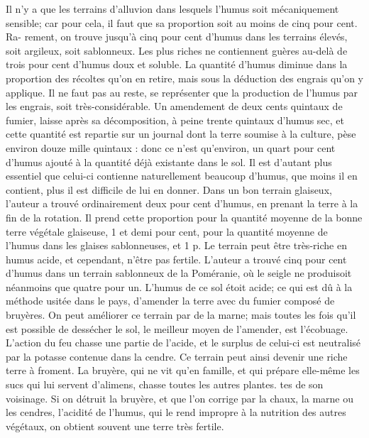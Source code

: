 Il n'y a que les terrains d'alluvion dans lesquels l'humus soit mécaniquement sensible; car pour cela, il faut que sa proportion soit au moins de cinq pour cent. Ra-\setcounter{page}{124} rement, on trouve jusqu'à cinq pour cent d'humus dans les terrains élevés, soit argileux, soit sablonneux. Les plus riches ne contiennent guères au-delà de trois pour cent d'humus doux et soluble. La quantité d'humus diminue dans la proportion des récoltes qu'on en retire, mais sous la déduction des engrais qu'on y applique. Il ne faut pas au reste, se représenter que la production de l'humus par les engrais, soit très-considérable. Un amendement de deux cents quintaux de fumier, laisse après sa décomposition, à peine trente quintaux d'humus sec, et cette quantité est repartie sur un journal dont la terre soumise à la culture, pèse environ douze mille quintaux : donc ce n'est qu'environ, un quart pour cent d'humus ajouté à la quantité déjà existante dans le sol. Il est d'autant plus essentiel que celui-ci contienne naturellement beaucoup d'humus, que moins il en contient, plus il est difficile de lui en donner.
Dans un bon terrain glaiseux, l'auteur a trouvé ordinairement deux pour cent d'humus, en prenant la terre à la fin de la rotation. Il prend cette proportion pour la quantité moyenne de la bonne terre végétale glaiseuse, 1 et demi pour cent, pour la quantité moyenne de l'humus\setcounter{page}{125} dans les glaises sablonneuses, et 1 p. %
Le terrain peut être très-riche en humus acide, et cependant, n'être pas fertile. L'auteur a trouvé cinq pour cent d'humus dans un terrain sablonneux de la Poméranie, où le seigle ne produisoit néanmoins que quatre pour un. L'humus de ce sol étoit acide; ce qui est dû à la méthode usitée dans le pays, d'amender la terre avec du fumier composé de bruyères. On peut améliorer ce terrain par de la marne; mais toutes les fois qu'il est possible de dessécher le sol, le meilleur moyen de l'amender, est l'écobuage. L'action du feu chasse une partie de l'acide, et le surplus de celui-ci est neutralisé par la potasse contenue dans la cendre. Ce terrain peut ainsi devenir une riche terre à froment.
La bruyère, qui ne vit qu'en famille, et qui prépare elle-même les sucs qui lui servent d'alimens, chasse toutes les autres plantes.\setcounter{page}{126} tes de son voisinage. Si on détruit la bruyère, et que l'on corrige par la chaux, la marne ou les cendres, l'acidité de l'humus, qui le rend impropre à la nutrition des autres végétaux, on obtient souvent une terre très fertile.

